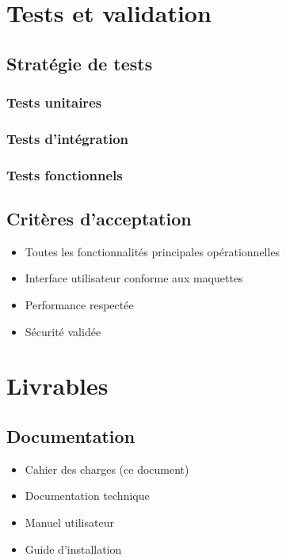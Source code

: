 \documentclass[12pt,a4paper]{article}
\begin{document}
\section{Tests et validation}

\subsection{Stratégie de tests}

\subsubsection{Tests unitaires}
\lipsum[15]

\subsubsection{Tests d'intégration}
\lipsum[16]

\subsubsection{Tests fonctionnels}
\lipsum[17]

\subsection{Critères d'acceptation}

\begin{itemize}
    \item Toutes les fonctionnalités principales opérationnelles
    \item Interface utilisateur conforme aux maquettes
    \item Performance respectée
    \item Sécurité validée
\end{itemize}

\section{Livrables}

\subsection{Documentation}

\begin{itemize}
    \item Cahier des charges (ce document)
    \item Documentation technique
    \item Manuel utilisateur
    \item Guide d'installation
\end{itemize}
\end{document}
